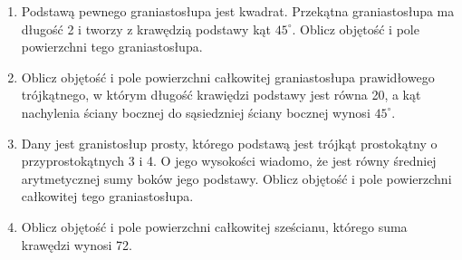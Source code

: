 \documentclass[12pt,a4paper]{article}
\begin{document}
\begin{enumerate}[1.]
	\item Podstawą pewnego graniastosłupa jest kwadrat. Przekątna graniastosłupa ma długość 2 i tworzy z krawędzią podstawy kąt $45^\circ$. Oblicz objętość i pole powierzchni tego graniastosłupa.
	
	\item Oblicz objętość i pole powierzchni całkowitej graniastosłupa prawidłowego trójkątnego, w którym długość krawiędzi podstawy jest równa 20, a kąt nachylenia ściany bocznej do sąsiedzniej ściany bocznej wynosi $45^\circ$.
	
	\item Dany jest granistosłup prosty, którego podstawą jest trójkąt prostokątny o przyprostokątnych 3 i 4. O jego wysokości wiadomo, że jest równy średniej arytmetycznej sumy boków jego podstawy. Oblicz objętość i pole powierzchni całkowitej tego graniastosłupa.
	
	\item Oblicz objętość i pole powierzchni całkowitej sześcianu, którego suma krawędzi wynosi 72.
\end{enumerate}
	
	
	
\end{document}
